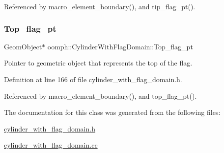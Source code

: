 Referenced by macro\+\_\+element\+\_\+boundary(), and tip\+\_\+flag\+\_\+pt().

\mbox{\label{classoomph_1_1CylinderWithFlagDomain_a92ae4556f99335233c1c653e15fa1f48}} 
\subsubsection{\texorpdfstring{Top\+\_\+flag\+\_\+pt}{Top\_flag\_pt}}
{\footnotesize\ttfamily Geom\+Object$\ast$ oomph\+::\+Cylinder\+With\+Flag\+Domain\+::\+Top\+\_\+flag\+\_\+pt\hspace{0.3cm}{\ttfamily [private]}}



Pointer to geometric object that represents the top of the flag. 



Definition at line 166 of file cylinder\+\_\+with\+\_\+flag\+\_\+domain.\+h.



Referenced by macro\+\_\+element\+\_\+boundary(), and top\+\_\+flag\+\_\+pt().



The documentation for this class was generated from the following files\+:\begin{DoxyCompactItemize}
\item 
\hyperlink{cylinder__with__flag__domain_8h}{cylinder\+\_\+with\+\_\+flag\+\_\+domain.\+h}\item 
\hyperlink{cylinder__with__flag__domain_8cc}{cylinder\+\_\+with\+\_\+flag\+\_\+domain.\+cc}\end{DoxyCompactItemize}
